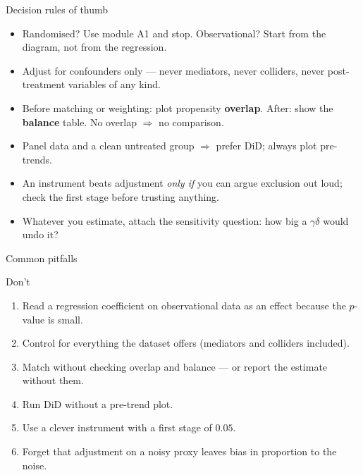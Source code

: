 \documentclass[aspectratio=169,11pt]{beamer}
\begin{document}
\begin{frame}{Decision rules of thumb}
  \begin{itemize}
    \item Randomised? Use module A1 and stop. Observational? Start from the diagram,
          not from the regression.
    \item Adjust for confounders only --- never mediators, never colliders, never
          post-treatment variables of any kind.
    \item Before matching or weighting: plot propensity \textbf{overlap}. After:
          show the \textbf{balance} table. No overlap $\Rightarrow$ no comparison.
    \item Panel data and a clean untreated group $\Rightarrow$ prefer DiD; always
          plot pre-trends.
    \item An instrument beats adjustment \emph{only if} you can argue exclusion out
          loud; check the first stage before trusting anything.
    \item Whatever you estimate, attach the sensitivity question: how big a
          $\gamma\delta$ would undo it?
  \end{itemize}
\end{frame}

\begin{frame}{Common pitfalls}
  \begin{alertblock}{Don't}
    \begin{enumerate}
      \item Read a regression coefficient on observational data as an effect
            because the $p$-value is small.
      \item Control for everything the dataset offers (mediators and colliders
            included).
      \item Match without checking overlap and balance --- or report the estimate
            without them.
      \item Run DiD without a pre-trend plot.
      \item Use a clever instrument with a first stage of $0.05$.
      \item Forget that adjustment on a noisy proxy leaves bias in proportion to
            the noise.
    \end{enumerate}
  \end{alertblock}
\end{frame}
\end{document}
